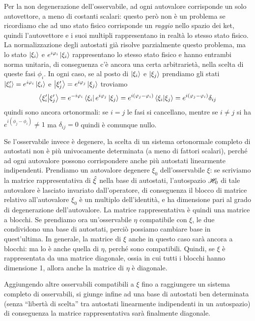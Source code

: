 Per la non degenerazione dell'osservabile, ad ogni autovalore corrisponde un solo autovettore, a meno di costanti scalari: questo però non è un problema se ricordiamo che ad uno stato fisico corrisponde un \emph{raggio} nello spazio dei ket, quindi l'autovettore e i suoi multipli rappresentano in realtà lo stesso stato fisico.
La normalizzazione degli autostati già risolve parzialmente questo problema, ma lo stato $\left|{\xi_i}\right\rangle$ e $e^{i\varphi_i}\left|{\xi_i}\right\rangle$ rappresentano lo stesso stato fisico e hanno entrambi norma unitaria, di conseguenza c'è ancora una certa arbitrarietà, nella scelta di queste fasi $\phi_i$.
In ogni caso, se al posto di $\left|{\xi_i}\right\rangle$ e $\left|{\xi_j}\right\rangle$ prendiamo gli stati $\left|{\xi_i'}\right\rangle=e^{i\varphi_i}\left|{\xi_i}\right\rangle$ e $\left|{\xi_j'}\right\rangle=e^{i\varphi_j}\left|{\xi_j}\right\rangle$ troviamo
\begin{equation}
	\left\langle{\xi_i'}\middle|{\xi_j'}\right\rangle=e^{-i\varphi_i}\left\langle{\xi_i}\right|e^{i\varphi_j}\left|{\xi_j}\right\rangle=e^{i(\varphi_j-\varphi_i)}\left\langle{\xi_i}\middle|{\xi_j}\right\rangle=e^{i(\varphi_j-\varphi_i)}\delta_{ij}
\end{equation}
quindi sono ancora ortonormali: se $i=j$ le fasi si cancellano, mentre se $i\ne j$ si ha $e^{i(\phi_j-\phi_i)}\ne 1$ ma $\delta_{ij}=0$ quindi è comunque nullo.

Se l'osservabile invece è degenere, la scelta di un sistema ortonormale completo di autostati non è più univocamente determinata (a meno di fattori scalari), perch\'e ad ogni autovalore possono corrispondere anche più autostati linearmente indipendenti.
Prendiamo un autovalore degenere $\xi_0$ dell'osservabile $\xi$: se scriviamo la matrice rappresentativa di $\hat{\xi}$ nella base di autostati, l'autospazio $\mathscr H_0$ di tale autovalore è lasciato invariato dall'operatore, di conseguenza il blocco di matrice relativo all'autovalore $\xi_0$ è un multiplo dell'identità, e ha dimensione pari al grado di degenerazione dell'autovalore.
La matrice rappresentativa è quindi una matrice a blocchi.
Se prendiamo ora un'osservabile $\eta$ compatibile con $\xi$, le due condividono una base di autostati, perciò possiamo cambiare base in quest'ultima.
In generale, la matrice di $\xi$ anche in questo caso sarà ancora a blocchi: ma lo è anche quella di $\eta$, perch\'e sono compatibili.
Quindi, se $\xi$ è rappresentata da una matrice diagonale, ossia in cui tutti i blocchi hanno dimensione 1, allora anche la matrice di $\eta$ è diagonale.

Aggiungendo altre osservabili compatibili a $\xi$ fino a raggiungere un sistema completo di osservabili, si giunge infine ad una base di autostati ben determinata (senza ``libertà di scelta'' tra autostati linearmente indipendenti in un autospazio) di conseguenza la matrice rappresentativa sarà finalmente diagonale.
